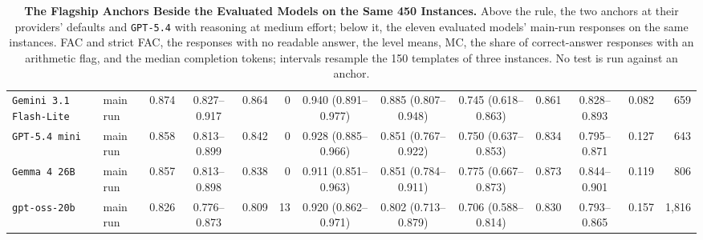 \begin{table}[t]
{\begin{tabular}{l l r c r r c c c r c r r}
\texttt{Gemini 3.1 Flash-Lite} & main run & 0.874 & 0.827--0.917 & 0.864 & 0 & 0.940 (0.891--0.977) & 0.885 (0.807--0.948) & 0.745 (0.618--0.863) & 0.861 & 0.828--0.893 & 0.082 & 659 \\
\texttt{GPT-5.4 mini} & main run & 0.858 & 0.813--0.899 & 0.842 & 0 & 0.928 (0.885--0.966) & 0.851 (0.767--0.922) & 0.750 (0.637--0.853) & 0.834 & 0.795--0.871 & 0.127 & 643 \\
\texttt{Gemma 4 26B} & main run & 0.857 & 0.813--0.898 & 0.838 & 0 & 0.911 (0.851--0.963) & 0.851 (0.784--0.911) & 0.775 (0.667--0.873) & 0.873 & 0.844--0.901 & 0.119 & 806 \\
\texttt{gpt-oss-20b} & main run & 0.826 & 0.776--0.873 & 0.809 & 13 & 0.920 (0.862--0.971) & 0.802 (0.713--0.879) & 0.706 (0.588--0.814) & 0.830 & 0.793--0.865 & 0.157 & 1,816 \\
\bottomrule
\end{tabular}
}
\caption{\textbf{The Flagship Anchors Beside the Evaluated Models on the Same 450 Instances.} Above the rule, the two anchors at their providers' defaults and \texttt{GPT-5.4} with reasoning at medium effort; below it, the eleven evaluated models' main-run responses on the same instances. FAC and strict FAC, the responses with no readable answer, the level means, MC, the share of correct-answer responses with an arithmetic flag, and the median completion tokens; intervals resample the 150 templates of three instances. No test is run against an anchor.}
\label{tab:anchors}
\end{table}
